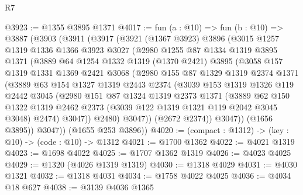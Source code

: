 \begin{lexlean}{R7}
\begin{coremodule}
@3923 := @1355 @3895 @1371
@4017 := fun (a : @10) =>
  fun (b : @10) =>
  @3887
    (@3903
      (@3911
        (@3917
          (@3921
            (@1367 @3923)
            @3896
            (@3015
              @1257
              @1319
              @1336
              @1366
              @3923
              @3027
              (@2980
                @1255
                @87
                @1334
                @1319
                @3895
                @1371
                (@3889
                  @64
                  @1254
                  @1332
                  @1319
                  (@1370 @2421)
                  @3895
                  (@3058
                    @157
                    @1319
                    @1331
                    @1369
                    @2421
                    @3068
                    (@2980
                      @155
                      @87
                      @1329
                      @1319
                      @2374
                      @1371
                      (@3889
                        @63
                        @154
                        @1327
                        @1319
                        @2443
                        @2374
                        (@3039
                          @153
                          @1319
                          @1326
                          @119
                          @2442
                          @3045
                          (@2980
                            @151
                            @87
                            @1324
                            @1319
                            @2373
                            @1371
                            (@3889
                              @62
                              @150
                              @1322
                              @1319
                              @2462
                              @2373
                              (@3039 @122 @1319 @1321 @119 @2042 @3045 @3048)
                              @2474)
                            @3047))
                        @2480)
                      @3047))
                  (@2672 @2374))
                @3047))
            (@1656 @3895))
          @3047))
      (@1655 @253 @3896))
@4020 := (compact : @1312) -> (key : @10) -> (code : @10) -> @1312
@4021 := @1700 @1362
@4022 := @4021 @1319
@4023 := @1698 @4022
@4025 := @1707 @1362 @1319
@4026 := @4023 @4025
@4029 := @1320 (@4026 @1319 @1319)
@4030 := @1318 @4029
@4031 := @4030 @1321
@4032 := @1318 @4031
@4034 := @1758 @4022 @4025
@4036 := @4034 @18 @627
@4038 := @3139 @4036 @1365

\end{coremodule}
\end{lexlean}
